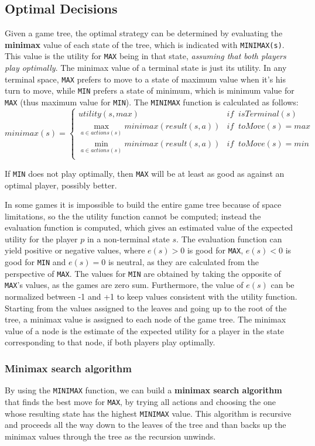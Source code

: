 \documentclass{article}
\newcommand{\code}{\lstinline}
\begin{document}
\subsection{Optimal Decisions}
Given a game tree, the optimal strategy can be determined by evaluating the \textbf{minimax} value of each state of the tree, which is indicated with \code{MINIMAX(s)}. This value is the utility for \code{MAX} being in that state, \textit{assuming that both players play optimally}. The minimax value of a terminal state is just its utility. In any terminal space, \code{MAX} prefers to move to a state of maximum value when it's his turn to move, while \code{MIN} prefers a state of minimum, which is minimum value for \code{MAX} (thus maximum value for \code{MIN}). The \code{MINIMAX} function is calculated as follows:
$$
    minimax(s)=
        \begin{cases}
            utility(s, max)&if\;\;isTerminal(s)\\
            \max_{a\in actions(s)}minimax(result(s,a))&if\;\;toMove(s) = max\\
            \min_{a\in actions(s)}minimax(result(s,a))&if\;\;toMove(s) = min\\        
        \end{cases}
$$

If \code{MIN} does not play optimally, then \code{MAX} will be at least as good as against an optimal player, possibly better.

In some games it is impossible to build the entire game tree because of space limitations, so the the utility function cannot be computed; instead the evaluation function is computed, which gives an estimated value of the expected utility for the player $p$ in a non-terminal state $s$. The evaluation function can yield positive or negative values, where $e(s) > 0$ is good for \code{MAX}, $e(s) < 0$ is good for \code{MIN} and $e(s) = 0$ is neutral, as they are calculated from the perspective of \code{MAX}. The values for \code{MIN} are obtained by taking the opposite of \code{MAX}'s values, as the games are zero sum. Furthermore, the value of $e(s)$ can be normalized between -1 and +1 to keep values consistent with the utility function. Starting from the values assigned to the leaves and going up to the root of the tree, a minimax value is assigned to each node of the game tree. The minimax value of a node is the estimate of the expected utility for a player in the state corresponding to that node, if both players play optimally.

\subsubsection{Minimax search algorithm}
By using the \code{MINIMAX} function, we can build a \textbf{minimax search algorithm} that finds the best move for \code{MAX}, by trying all actions and choosing the one whose resulting state has the highest \code{MINIMAX} value. This algorithm is recursive and proceeds all the way down to the leaves of the tree and than backs up the minimax values through the tree as the recursion unwinds.
\end{document}
